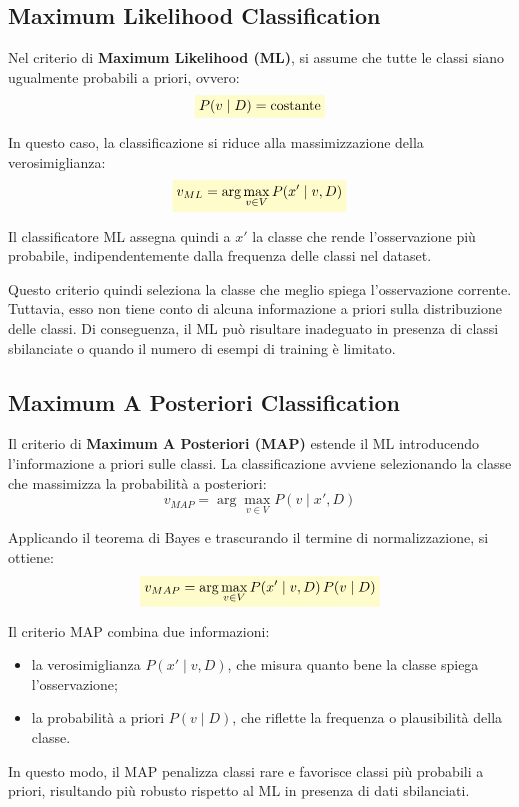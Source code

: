 \documentclass[a4paper,12pt]{report}
\newcommand{\highlight}[1]{%
\colorbox{yellow!20}{$\displaystyle #1$}%
}
\begin{document}
\subsection{Maximum Likelihood Classification}

Nel criterio di \textbf{Maximum Likelihood (ML)}, si assume che tutte le classi siano ugualmente probabili a priori, ovvero:
\[
\highlight{
P(v \mid D) = \text{costante}}
\]

In questo caso, la classificazione si riduce alla massimizzazione della verosimiglianza:
\[
\highlight{
v_{ML} = \arg\max_{v \in V} P(x' \mid v, D)}
\]

Il classificatore ML assegna quindi a \( x' \) la classe che rende l’osservazione più probabile, indipendentemente dalla frequenza delle classi nel dataset.

Questo criterio quindi seleziona la classe che meglio spiega l’osservazione corrente.
Tuttavia, esso non tiene conto di alcuna informazione a priori sulla distribuzione delle classi.
Di conseguenza, il ML può risultare inadeguato in presenza di classi sbilanciate o quando il numero di esempi di training è limitato.


\subsection{Maximum A Posteriori Classification}

Il criterio di \textbf{Maximum A Posteriori (MAP)} estende il ML introducendo l’informazione a priori sulle classi.
La classificazione avviene selezionando la classe che massimizza la probabilità a posteriori:
\[
v_{MAP} = \arg\max_{v \in V} P(v \mid x', D)
\]

Applicando il teorema di Bayes e trascurando il termine di normalizzazione, si ottiene:
\[
\highlight{
v_{MAP} = \arg\max_{v \in V} P(x' \mid v, D)\, P(v \mid D)}
\]

Il criterio MAP combina due informazioni:
\begin{itemize}
    \item la verosimiglianza \( P(x' \mid v, D) \), che misura quanto bene la classe spiega l’osservazione;
    \item la probabilità a priori \( P(v \mid D) \), che riflette la frequenza o plausibilità della classe.
\end{itemize}

In questo modo, il MAP penalizza classi rare e favorisce classi più probabili a priori, risultando più robusto rispetto al ML in presenza di dati sbilanciati.
\end{document}
